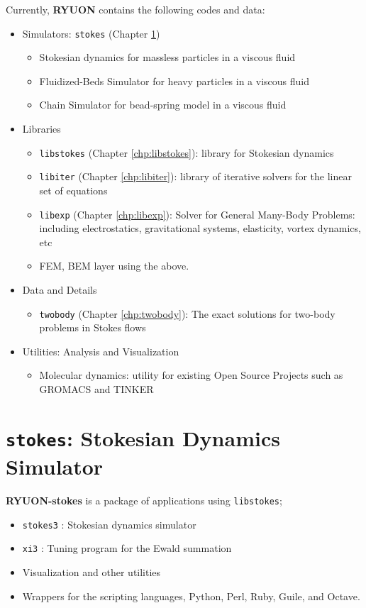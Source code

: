 \documentclass{book}
\begin{document}
Currently, {\bf RYUON} contains the following codes and data:
\begin{itemize}
\item Simulators: {\tt stokes} (Chapter \ref{chp:stokes})
  \begin{itemize}
  \item Stokesian dynamics for massless particles in a viscous fluid
  \item Fluidized-Beds Simulator
    \cite{IchikiHayakawa1995,IchikiHayakawa1998}
    for heavy particles in a viscous fluid
  \item Chain Simulator for bead-spring model in a viscous fluid
  \end{itemize}
\item Libraries
  \begin{itemize}
  \item {\tt libstokes} (Chapter \ref{chp:libstokes}):
    library for Stokesian dynamics
    \cite{BradyBossis1988,DurlofskyEtal1987,BradyEtal1988,Ichiki2002}
  \item {\tt libiter} (Chapter \ref{chp:libiter}):
    library of iterative solvers for the linear set of equations
    \cite{IchikiBrady2001}
  \item {\tt libexp} (Chapter \ref{chp:libexp}):
    Solver for General Many-Body Problems:
    including electrostatics, gravitational systems,
    elasticity, vortex dynamics, etc
  \item FEM, BEM layer using the above.
  \end{itemize}
\item Data and Details
  \begin{itemize}
  \item {\tt twobody} (Chapter \ref{chp:twobody}):
    The exact solutions for two-body problems in Stokes flows
    \cite{JeffreyOnishi1984,jeffrey1992,jeffrey1993}
  \end{itemize}
\item Utilities: Analysis and Visualization
  \begin{itemize}
  \item Molecular dynamics:
    utility for existing Open Source Projects such as GROMACS and TINKER
    \cite{IchikiConsta2006}
  \end{itemize}
\end{itemize}




\chapter{{\tt stokes}: Stokesian Dynamics Simulator}
\label{chp:stokes}
{\bf RYUON-stokes} is a package of applications using {\tt libstokes};
\begin{itemize}
\item {\tt stokes3} : Stokesian dynamics simulator
\item {\tt xi3} : Tuning program for the Ewald summation
\item Visualization and other utilities
\item Wrappers for the scripting languages,
  Python, Perl, Ruby, Guile, and Octave.
\end{itemize}
\end{document}
